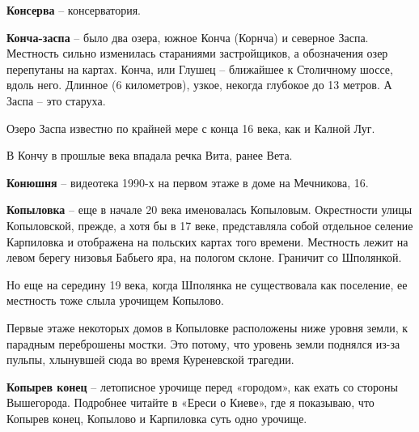 \textbf{Консерва} – консерватория.\\

\medskip

\textbf{Конча-заспа} – было два озера, южное Конча (Корнча) и северное Заспа. Местность сильно изменилась стараниями застройщиков, а обозначения озер перепутаны на картах. Конча, или Глушец – ближайшее к Столичному шоссе, вдоль него. Длинное (6 километров), узкое, некогда глубокое до 13 метров. А Заспа – это старуха.

Озеро Заспа известно по крайней мере с конца 16 века, как и Калной Луг.

В Кончу в прошлые века впадала речка Вита, ранее Вета.\\

\medskip

\textbf{Конюшня} – видеотека 1990-х на первом этаже в доме на Мечникова, 16.\\

\medskip

\textbf{Копыловка} – еще в начале 20 века именовалась Копыловым. Окрестности улицы Копыловской, прежде, а хотя бы в 17 веке, представляла собой отдельное селение Карпиловка и отображена на польских картах того времени. Местность лежит на левом берегу низовья Бабьего яра, на пологом склоне. Граничит со Шполянкой.

Но еще на середину 19 века, когда Шполянка не существовала как поселение, ее местность тоже слыла урочищем Копылово.

Первые этаже некоторых домов в Копыловке расположены ниже уровня земли, к парадным переброшены мостки. Это потому, что уровень земли поднялся из-за пульпы, хлынувшей сюда во время Куреневской трагедии.\\

\medskip

\textbf{Копырев конец} – летописное урочище перед «городом», как ехать со стороны Вышегорода. Подробнее читайте в «Ереси о Киеве», где я показываю, что Копырев конец, Копылово и Карпиловка суть одно урочище.\\

\medskip



